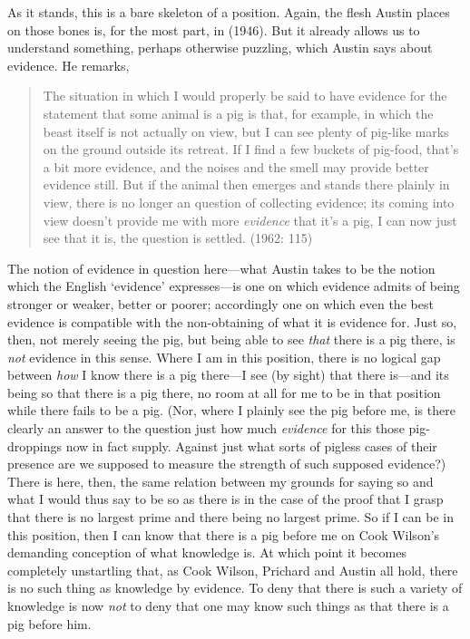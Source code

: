 As it stands, this is a bare skeleton of a position. Again, the flesh Austin places on those bones is, for the most part, in (1946). But it already allows us to understand something, perhaps otherwise puzzling, which Austin says about evidence. He remarks,
\begin{quote}
	The situation in which I would properly be said to have evidence for the statement that some animal is a pig is that, for example, in which the beast itself is not actually on view, but I can see plenty of pig-like marks on the ground outside its retreat. If I find a few buckets of pig-food, that’s a bit more evidence, and the noises and the smell may provide better evidence still. But if the animal then emerges and stands there plainly in view, there is no longer an question of collecting evidence; its coming into view doesn’t provide me with more \emph{evidence} that it’s a pig, I can now just see that it is, the question is settled. (1962: 115)
\end{quote}
The notion of evidence in question here---what Austin takes to be the notion which the English `evidence' expresses---is one on which evidence admits of being stronger or weaker, better or poorer; accordingly one on which even the best evidence is compatible with the non-obtaining of what it is evidence for. Just so, then, not merely seeing the pig, but being able to see \emph{that} there is a pig there, is \emph{not} evidence in this sense. Where I am in this position, there is no logical gap between \emph{how} I know there is a pig there---I see (by sight) that there is---and its being so that there is a pig there, no room at all for me to be in that position while there fails to be a pig. (Nor, where I plainly see the pig before me, is there clearly an answer to the question just how much \emph{evidence} for this those pig-droppings now in fact supply. Against just what sorts of pigless cases of their presence are we supposed to measure the strength of such supposed evidence?) There is here, then, the same relation between my grounds for saying so and what I would thus say to be so as there is in the case of the proof that I grasp that there is no largest prime and there being no largest prime. So if I can be in this position, then I can know that there is a pig before me on Cook Wilson’s demanding conception of what knowledge is. At which point it becomes completely unstartling that, as Cook Wilson, Prichard and Austin all hold, there is no such thing as knowledge by evidence. To deny that there is such a variety of knowledge is now \emph{not} to deny that one may know such things as that there is a pig before him.

